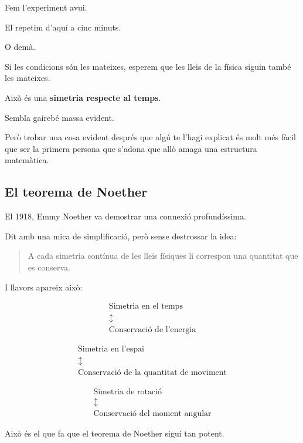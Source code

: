 Fem l'experiment avui.

El repetim d'aquí a cinc minuts.

O demà.

Si les condicions són les mateixes, esperem que les lleis de la física siguin també les mateixes.

Això és una \textbf{simetria respecte al temps}.

Sembla gairebé massa evident.

Però trobar una cosa evident després que algú te l'hagi explicat és molt més fàcil que ser la primera persona que s'adona que allò amaga una estructura matemàtica.

\subsection{El teorema de Noether}

El 1918, Emmy Noether va demostrar una connexió profundíssima.

Dit amb una mica de simplificació, però sense destrossar la idea:

\begin{quote}
A cada simetria contínua de les lleis físiques li correspon una quantitat que es conserva.
\end{quote}

I llavors apareix això:



\[
\boxed{
\begin{array}{c}
\text{Simetria en el temps} \\
\updownarrow \\
\text{Conservació de l'energia}
\end{array}
}
\]

\[
\boxed{
\begin{array}{c}
\text{Simetria en l'espai} \\
\updownarrow \\
\text{Conservació de la quantitat de moviment}
\end{array}
}
\]

\[
\boxed{
\begin{array}{c}
\text{Simetria de rotació} \\
\updownarrow \\
\text{Conservació del moment angular}
\end{array}
}
\]




Això és el que fa que el teorema de Noether sigui tan potent.

